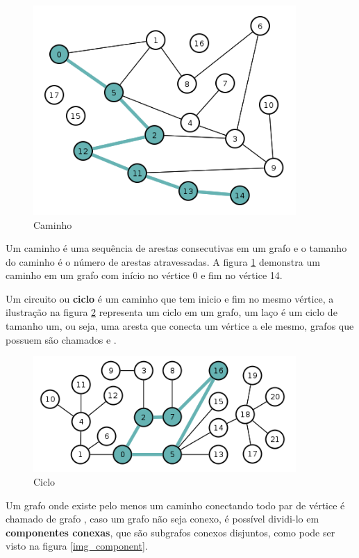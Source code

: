 \documentclass[a4paper]{abnt}
\begin{document}
\begin{figure}[htb]
    \centering
	\includegraphics[width=10cm]{path.png}
	\caption{Caminho}
	\label{img_path}
\end{figure}

Um caminho é uma sequência de arestas consecutivas em um grafo e o tamanho do caminho é o número de arestas atravessadas. A figura \ref{img_path} demonstra um caminho em um grafo com início no vértice 0 e fim no vértice 14.

Um circuito ou \textbf{ciclo} é um caminho que tem inicio e fim no mesmo vértice, a ilustração na figura \ref{img_cilce} representa um ciclo em um grafo, um laço é um ciclo de tamanho um, ou seja, uma aresta que conecta um vértice a ele mesmo, grafos que possuem  são chamados e .

\begin{figure}[htb]
    \centering
	\includegraphics[width=10cm]{cicle.png}
	\caption{Ciclo}
	\label{img_cilce}
\end{figure}

Um grafo onde existe pelo menos um caminho conectando todo par de vértice é chamado de grafo , caso um grafo não seja conexo, é possível dividi-lo em \textbf{componentes conexas}, que são subgrafos conexos disjuntos, como pode ser visto na figura \ref{img_component}.
\end{document}
